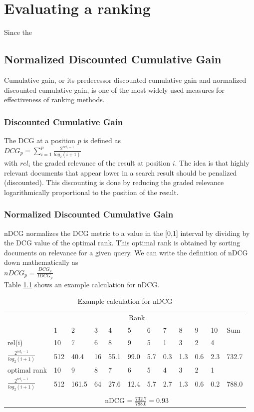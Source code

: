 \chapter{Evaluating a ranking}
Since the 
\section{Normalized Discounted Cumulative Gain}
Cumulative gain, or its predecessor discounted cumulative gain and normalized discounted cumulative gain, is one of the most widely used measures for effectiveness of ranking methods.
\subsection{Discounted Cumulative Gain}
The \ac{DCG}\cite{Burges2005} at a position $p$ is defined as\\
$DCG_p = \sum\nolimits_{i=1}^p \frac{2^{rel_i-1}}{log_2(i+1)}$\\
with $rel_i$ the graded relevance of the result at position $i$. The idea is that highly relevant documents that appear lower in a search result should be penalized (discounted). This discounting is done by reducing the graded relevance  logarithmically proportional to the position of the result.
\subsection{Normalized Discounted Cumulative Gain}
\ac{nDCG} normalizes the \ac{DCG} metric to a value in the [0,1] interval by dividing by the \ac{DCG} value of the optimal rank. This optimal rank is obtained by sorting documents on relevance for a given query. We can write the definition of \ac{nDCG} down mathematically as\\
$nDCG_p = \frac{DCG_p}{IDCG_p}$\\
Table \ref{tab:example_calculation_nDCG} shows an example calculation for \ac{nDCG}.

\begin{table}
\begin{tabular}{llllllllllll}
 & \multicolumn{10}{c}{Rank} &  \\ 
\cline{2-11}
 & 1 & 2 & 3 & 4 & 5 & 6 & 7 & 8 & 9 & 10 & Sum \\ 
\hline
rel(i) & 10 & 7 & 6 & 8 & 9 & 5 & 1 & 3 & 2 & 4 &  \\ 
$\frac{2^{rel_i-1}}{log_2(i+1)}$ & 512 & 40.4 & 16 & 55.1 & 99.0 & 5.7 & 0.3 & 1.3 & 0.6 & 2.3 & 732.7 \\ 
\hline
optimal rank & 10 & 9 & 8 & 7 & 6 & 5 & 4 & 3 & 2 & 1 &  \\ 
$\frac{2^{rel_i-1}}{log_2(i+1)}$ & 512 & 161.5 & 64 & 27.6 & 12.4 & 5.7 & 2.7 & 1.3 & 0.6 & 0.2 & 788.0 \\ 
\hline
 &  &  &  &  &  &  &  &  &  &  &  \\ 
 & \multicolumn{10}{c}{nDCG = $\frac{732.7}{788.0} = 0.93$} &  \\ 
\end{tabular}
\caption{Example calculation for \ac{nDCG}}
\label{tab:example_calculation_nDCG}
\end{table}
